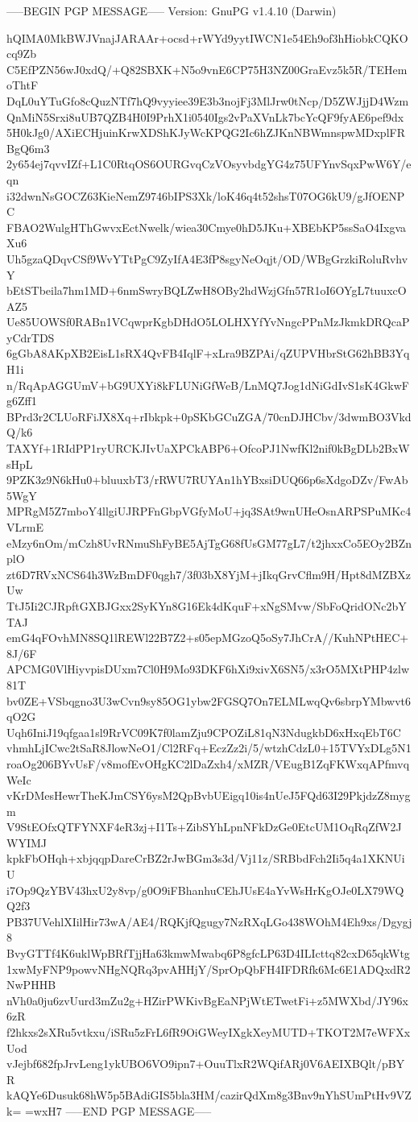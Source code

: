 -----BEGIN PGP MESSAGE-----
Version: GnuPG v1.4.10 (Darwin)

hQIMA0MkBWJVnajJARAAr+ocsd+rWYd9yytIWCN1e54Eh9of3hHiobkCQKOcq9Zb
C5EfPZN56wJ0xdQ/+Q82SBXK+N5o9vnE6CP75H3NZ00GraEvz5k5R/TEHemoThtF
DqL0uYTuGfo8cQuzNTf7hQ9vyyiee39E3b3nojFj3MlJrw0tNcp/D5ZWJjjD4Wzm
QnMiN5Srxi8uUB7QZB4H0I9PrhX1i0540Igs2vPaXVnLk7bcYcQF9fyAE6pef9dx
5H0kJg0/AXiECHjuinKrwXDShKJyWcKPQG2Ic6hZJKnNBWmnspwMDxplFRBgQ6m3
2y654ej7qvvIZf+L1C0RtqOS6OURGvqCzVOsyvbdgYG4z75UFYnvSqxPwW6Y/eqn
i32dwnNsGOCZ63KieNemZ9746bIPS3Xk/loK46q4t52shsT07OG6kU9/gJfOENPC
FBAO2WulgHThGwvxEctNwelk/wiea30Cmye0hD5JKu+XBEbKP5ssSaO4IxgvaXu6
Uh5gzaQDqvCSf9WvYTtPgC9ZyIfA4E3fP8sgyNeOqjt/OD/WBgGrzkiRoluRvhvY
bEtSTbeila7hm1MD+6nmSwryBQLZwH8OBy2hdWzjGfn57R1oI6OYgL7tuuxcOAZ5
Ue85UOWSf0RABn1VCqwprKgbDHdO5LOLHXYfYvNngcPPnMzJkmkDRQcaPyCdrTDS
6gGbA8AKpXB2EisL1sRX4QvFB4IqlF+xLra9BZPAi/qZUPVHbrStG62hBB3YqH1i
n/RqApAGGUmV+bG9UXYi8kFLUNiGfWeB/LnMQ7Jog1dNiGdIvS1sK4GkwFg6Zff1
BPrd3r2CLUoRFiJX8Xq+rIbkpk+0pSKbGCuZGA/70cnDJHCbv/3dwmBO3VkdQ/k6
TAXYf+1RIdPP1ryURCKJIvUaXPCkABP6+OfcoPJ1NwfKl2nif0kBgDLb2BxWsHpL
9PZK3z9N6kHu0+bluuxbT3/rRWU7RUYAn1hYBxsiDUQ66p6sXdgoDZv/FwAb5WgY
MPRgM5Z7mboY4llgiUJRPFnGbpVGfyMoU+jq3SAt9wnUHeOsnARPSPuMKc4VLrmE
eMzy6nOm/mCzh8UvRNmuShFyBE5AjTgG68fUsGM77gL7/t2jhxxCo5EOy2BZnplO
zt6D7RVxNCS64h3WzBmDF0qgh7/3f03bX8YjM+jIkqGrvCflm9H/Hpt8dMZBXzUw
TtJ5Ii2CJRpftGXBJGxx2SyKYn8G16Ek4dKquF+xNgSMvw/SbFoQridONc2bYTAJ
emG4qFOvhMN8SQ1lREWl22B7Z2+s05epMGzoQ5oSy7JhCrA//KuhNPtHEC+8J/6F
APCMG0VlHiyvpisDUxm7Cl0H9Mo93DKF6hXi9xivX6SN5/x3rO5MXtPHP4zlw81T
bv0ZE+VSbqgno3U3wCvn9sy85OG1ybw2FGSQ7On7ELMLwqQv6sbrpYMbwvt6qO2G
Uqh6IniJ19qfgaa1sl9RrVC09K7f0lamZju9CPOZiL81qN3NdugkbD6xHxqEbT6C
vhmhLjICwc2tSaR8JlowNeO1/Cl2RFq+EczZz2i/5/wtzhCdzL0+15TVYxDLg5N1
roaOg206BYvUsF/v8mofEvOHgKC2lDaZxh4/xMZR/VEugB1ZqFKWxqAPfmvqWeIc
vKrDMesHewrTheKJmCSY6ysM2QpBvbUEigq10is4nUeJ5FQd63I29PkjdzZ8mygm
V9StEOfxQTFYNXF4eR3zj+I1Ts+ZibSYhLpnNFkDzGe0EtcUM1OqRqZfW2JWYIMJ
kpkFbOHqh+xbjqqpDareCrBZ2rJwBGm3s3d/Vj11z/SRBbdFch2Ii5q4a1XKNUiU
i7Op9QzYBV43hxU2y8vp/g0O9iFBhanhuCEhJUsE4aYvWsHrKgOJe0LX79WQQ2f3
PB37UVehlXIilHir73wA/AE4/RQKjfQgugy7NzRXqLGo438WOhM4Eh9xs/Dgygj8
BvyGTTf4K6uklWpBRfTjjHa63kmwMwabq6P8gfcLP63D4ILIcttq82cxD65qkWtg
1xwMyFNP9powvNHgNQRq3pvAHHjY/SprOpQbFH4IFDRfk6Mc6E1ADQxdR2NwPHHB
nVh0a0ju6zvUurd3mZu2g+HZirPWKivBgEaNPjWtETwetFi+z5MWXbd/JY96x6zR
f2hkxs2sXRu5vtkxu/iSRu5zFrL6fR9OiGWeyIXgkXeyMUTD+TKOT2M7eWFXxUod
vJejbf682fpJrvLeng1ykUBO6VO9ipn7+OuuTlxR2WQifARj0V6AEIXBQlt/pBYR
kAQYe6Dusuk68hW5p5BAdiGIS5bla3HM/cazirQdXm8g3Bnv9nYhSUmPtHv9VZk=
=wxH7
-----END PGP MESSAGE-----
